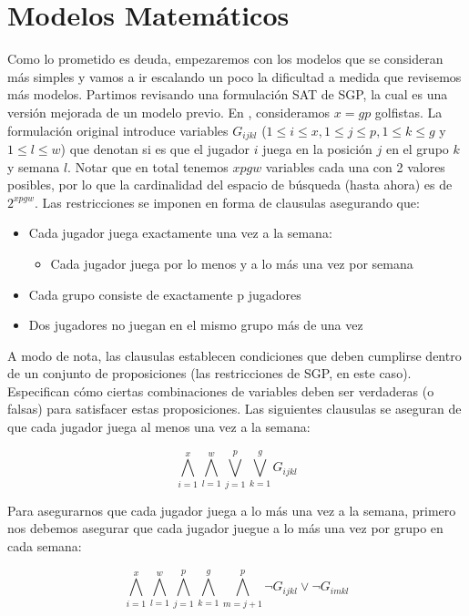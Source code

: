 \documentclass[letter, 10pt]{article}
\begin{document}
\section{Modelos Matemáticos} \label{mod}
Como lo prometido es deuda, empezaremos con los modelos que se consideran más simples y vamos a ir escalando un poco la dificultad a medida que revisemos más modelos. Partimos revisando una formulación SAT de SGP, la cual es una versión mejorada de un modelo previo. En \cite{triska2012improved}, consideramos $x=gp$ golfistas. La formulación original introduce variables $G_{ijkl}$ ($1\leq i \leq x, 1\leq j \leq p, 1\leq k \leq g$ y $1\leq l \leq w$) que denotan si es que el jugador $i$ juega en la posición $j$ en el grupo $k$ y semana $l$. Notar que en total tenemos $xpgw$ variables cada una con 2 valores posibles, por lo que la cardinalidad del espacio de búsqueda (hasta ahora) es de $2^{xpgw}$. Las restricciones se imponen en forma de clausulas asegurando que:
\begin{itemize}
    \item Cada jugador juega exactamente una vez a la semana:
    \begin{itemize}
        \item Cada jugador juega por lo menos y a lo más una vez por semana
    \end{itemize}
    \item Cada grupo consiste de exactamente p jugadores
    \item Dos jugadores no juegan en el mismo grupo más de una vez
\end{itemize}

A modo de nota, las clausulas establecen condiciones que deben cumplirse dentro de un conjunto de proposiciones (las restricciones de SGP, en este caso). Especifican cómo ciertas combinaciones de variables deben ser verdaderas (o falsas) para satisfacer estas proposiciones.
Las siguientes clausulas se aseguran de que cada jugador juega al menos una vez a la semana:

\begin{equation}
    \bigwedge_{i=1}^{x} \bigwedge_{l=1}^{w} \bigvee_{j=1}^{p} \bigvee_{k=1}^{g} G_{ijkl}
    \label{eq:1}
\end{equation}

Para asegurarnos que cada jugador juega a lo más una vez a la semana, primero nos debemos asegurar que cada jugador juegue a lo más una vez por grupo en cada semana:

\begin{equation}
    \bigwedge_{i=1}^{x} \bigwedge_{l=1}^{w} \bigwedge_{j=1}^{p} \bigwedge_{k=1}^{g} \bigwedge_{m=j+1}^{p} \neg G_{ijkl} \vee \neg G_{imkl}
    \label{eq:2}
\end{equation}
\end{document}
